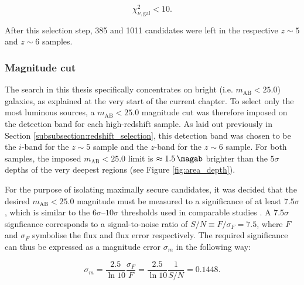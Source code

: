 \begin{equation}
\chi^2_{\nu,\mathrm{gal}}< 10. \label{eqn:galaxy_fit}
\end{equation}

\noindent After this selection step, 385 and 1011 candidates were left in the respective $z\sim5$ and $z\sim6$ samples. \par



\subsubsection{Magnitude cut}\label{subsubsection:mag_cut}
The search in this thesis specifically concentrates on bright (i.e. $m_{\mathrm{AB}}<25.0$) galaxies, as explained at the very start of the current chapter. To select only the most luminous sources, a $m_{\mathrm{AB}}<25.0$ magnitude cut was therefore imposed on the detection band for each high-redshift sample. As laid out previously in Section \ref{subsubsection:redshift_selection}, this detection band was chosen to be the $i$-band for the $z\sim5$ sample and the $z$-band for the $z\sim6$ sample. For both samples, the imposed $m_{\mathrm{AB}}< 25.0$ limit is $\approx\SI{1.5}{\magab}$ brighter than the $5\sigma$ depths of the very deepest regions (see Figure \ref{fig:area_depth}).  \par


For the purpose of isolating maximally secure candidates, it was decided that the desired $m_{\mathrm{AB}}< 25.0$ magnitude must be measured to a significance of at least $7.5 \sigma$, which is similar to the $6\sigma\text{--}10\sigma$ thresholds used in comparable studies \citep{2009MNRAS.395.2196M,2013AJ....145....4W,2015MNRAS.452.1817B}. A $7.5 \sigma$ signficance corresponds to a signal-to-noise ratio of $S/N \equiv F/\sigma_F =7.5$, where $F$ and $\sigma_{F}$ symbolise the flux and flux error respectively. The required significance can thus be expressed as a magnitude error $\sigma_{m}$ in the following way:



\begin{equation}
\sigma_{m}=\frac{2.5}{\ln{10}} \frac{\sigma_F}{F} = \frac{2.5}{\ln{10}} \frac{1}{S/N} = 0.1448. \label{eqn:sigma_m}
\end{equation}

